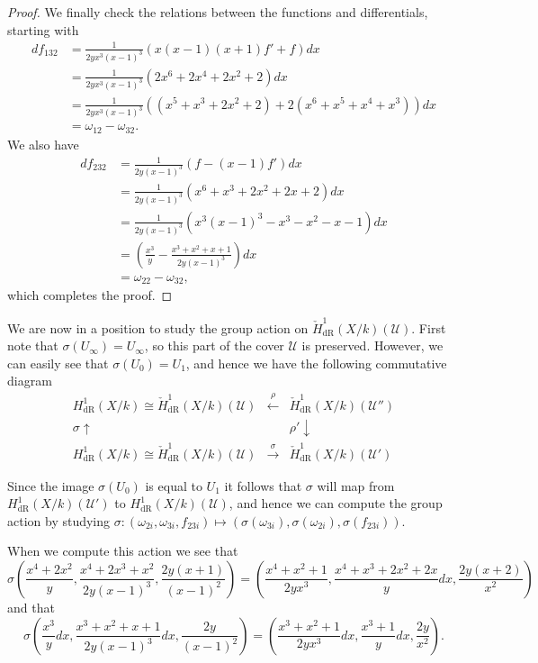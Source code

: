 \documentclass[draft, 11pt]{article} %
\theoremstyle{plain}
\theoremstyle{remark}
\newcommand{\cU}{{\mathcal U}}
\newcommand{\derhamhone}{H_{\text {dR}}^1(X/k)}
\newcommand{\cechderhamhone}{\check{H}_{\text {dR}}^1(X/k)}
\begin{document}
\begin{proof}
We finally check the relations between the functions and differentials, starting with
\begin{align}
df_{132} & = \frac{1}{2yx^3(x-1)^3} (x(x-1)(x+1)f' + f)dx \\
& = \frac{1}{2yx^3(x-1)^3}(2x^6 + 2x^4 + 2x^2 + 2)dx \\
& = \frac{1}{2yx^3(x-1)^3}((x^5 + x^3 + 2x^2 + 2) + 2(x^6 + x^5 + x^4 + x^3))dx \\
& = \omega_{12} - \omega_{32}.
\end{align}
We also have
\begin{align}
df_{232} & = \frac{1}{2y(x-1)^3}(f-(x-1)f')dx \\
& = \frac{1}{2y(x-1)^3}(x^6 + x^3 + 2x^2 + 2x+ 2)dx \\
& = \frac{1}{2y(x-1)^3}(x^3(x-1)^3 - x^3 - x^2 - x - 1) dx \\
& = \left(\frac{x^3}{y} - \frac{x^3 + x^2 + x+1}{2y(x-1)^3}\right) dx \\
& = \omega_{22} - \omega_{32},
\end{align}
which completes the proof.

\end{proof}

We are now in a position to study the group action on $\cechderhamhone(\cU)$.
First note that $\sigma(U_\infty) = U_\infty$, so this part of the cover $\cU$ is preserved.
However, we can easily see that $\sigma(U_0) = U_1$, and hence we have the following commutative diagram
\[
\begin{array}{ccc}
\derhamhone \cong \cechderhamhone(\cU)  & \xleftarrow{\rho} & \cechderhamhone(\cU'')  \\
\sigma\uparrow & ~ & \rho'\downarrow  \\
\derhamhone \cong \cechderhamhone(\cU)  & \xrightarrow{\sigma} & \cechderhamhone(\cU')
\end{array}
\]

Since the image $\sigma (U_0)$ is equal to $U_1$ it follows that $\sigma$ will map from $\derhamhone(\cU')$ to $\derhamhone(\cU)$, and hence we can compute the group action by studying $\sigma \colon (\omega_{2i}, \omega_{3i}, f_{23i}) \mapsto (\sigma(\omega_{3i}), \sigma (\omega_{2i}), \sigma(f_{23i}))$.

When we compute this action we see that
\[
\sigma\left( \frac{x^4 + 2x^2}{y}, \frac{x^4+2x^3+x^2}{2y(x-1)^3} , \frac{2y(x+1)}{(x-1)^2} \right) = \left( \frac{x^4 + x^2 + 1}{2yx^3}, \frac{x^4 + x^3 + 2x^2 + 2x}{y}dx, \frac{2y(x+2)}{x^2} \right)
\]
and that
\[
\sigma\left( \frac{x^3}{y}dx, \frac{x^3 + x^2 + x + 1}{2y(x-1)^3}dx, \frac{2y}{(x-1)^2} \right) = \left( \frac{x^3 + x^2 + 1}{2yx^3}dx, \frac{x^3 + 1}{y}dx, \frac{2y}{x^2}\right).
\]
\end{document}

